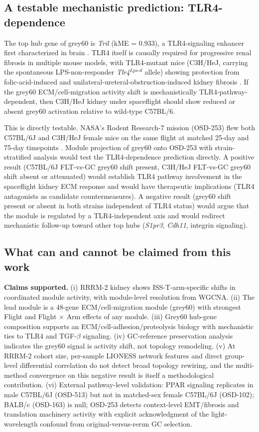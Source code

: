 \documentclass[11pt]{article}
\newcommand{\gene}[1]{\textit{#1}}
\begin{document}
\subsection{A testable mechanistic prediction: TLR4-dependence}

The top hub gene of grey60 is \gene{Tril} (kME = 0.933), a TLR4-signaling enhancer first characterized in brain \citep{carpenter2009tril, wochal2011tlr3}. TLR4 itself is causally required for progressive renal fibrosis in multiple mouse models, with TLR4-mutant mice (C3H/HeJ, carrying the spontaneous LPS-non-responder \emph{Tlr4}$^{Lps\text{-}d}$ allele) showing protection from folic-acid-induced and unilateral-ureteral-obstruction-induced kidney fibrosis \citep{souza2015tlr4, pulskens2010tlr4}. If the grey60 ECM/cell-migration activity shift is mechanistically TLR4-pathway-dependent, then C3H/HeJ kidney under spaceflight should show reduced or absent grey60 activation relative to wild-type C57BL/6.

This is directly testable. NASA's Rodent Research-7 mission (OSD-253) flew both C57BL/6J and C3H/HeJ female mice on the same flight at matched 25-day and 75-day timepoints \citep{wronski2019rr7}. Module projection of grey60 onto OSD-253 with strain-stratified analysis would test the TLR4-dependence prediction directly. A positive result (C57BL/6J FLT-vs-GC grey60 shift present, C3H/HeJ FLT-vs-GC grey60 shift absent or attenuated) would establish TLR4 pathway involvement in the spaceflight kidney ECM response and would have therapeutic implications (TLR4 antagonists as candidate countermeasures). A negative result (grey60 shift present or absent in both strains independent of TLR4 status) would argue that the module is regulated by a TLR4-independent axis and would redirect mechanistic follow-up toward other top hubs (\gene{S1pr3}, \gene{Cdh11}, integrin signaling).

\subsection{What can and cannot be claimed from this work}

\textbf{Claims supported.} (i) RRRM-2 kidney shows ISS-T-arm-specific shifts in coordinated module activity, with module-level resolution from WGCNA. (ii) The lead module is a 48-gene ECM/cell-migration module (grey60) with strongest Flight and Flight $\times$ Arm effects of any module. (iii) Grey60 hub-gene composition supports an ECM/cell-adhesion/proteolysis biology with mechanistic ties to TLR4 and TGF-$\beta$ signaling. (iv) GC-reference preservation analysis indicates the grey60 signal is activity shift, not topology remodeling. (v) At RRRM-2 cohort size, per-sample LIONESS network features and direct group-level differential correlation do not detect broad topology rewiring, and the multi-method convergence on this negative result is itself a methodological contribution. (vi) External pathway-level validation: PPAR signaling replicates in male C57BL/6J (OSD-513) but not in matched-sex female C57BL/6J (OSD-102); BALB/c (OSD-163) is null; OSD-253 detects context-level EMT/fibrosis and translation machinery activity with explicit acknowledgment of the light-wavelength confound from original-versus-rerun GC selection.
\end{document}
